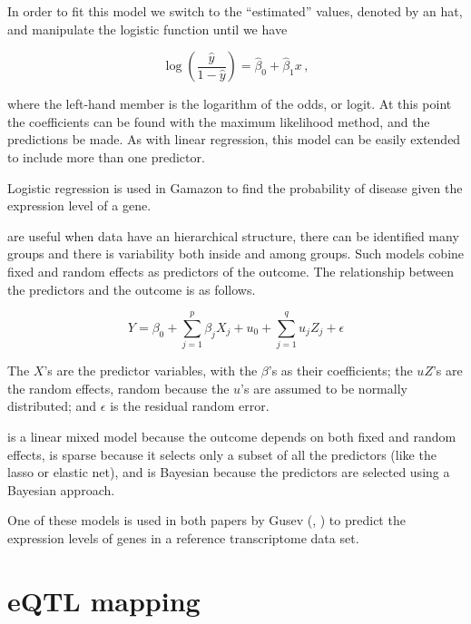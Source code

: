 \documentclass[../main.tex]{subfiles}
\begin{document}
In order to fit this model we switch to the \enquote{estimated} values, 
denoted by an hat, and manipulate the logistic function until we have

\begin{equation}
	\log\left(\frac{\hat{y}}{1-\hat{y}}\right) =
		\hat{\beta}_0 + \hat{\beta}_1 x\,,
\end{equation}

where the left-hand member is the logarithm of the odds, or logit. At 
this point the coefficients can be found with the maximum likelihood 
method, and the predictions be made. As with linear regression, this 
model can be easily extended to include more than one predictor.

Logistic regression is used in Gamazon \etal to find the probability of 
disease given the expression level of a gene.

 are useful when data have an 
hierarchical structure, \ie there can be identified many groups and 
there is variability both inside and among groups. Such models cobine 
fixed and random effects as predictors of the outcome. The relationship 
between the predictors and the outcome is as follows.

\begin{equation}
	Y = \beta_0 + \sum_{j=1}^{p} \beta_j X_j +
		u_0 + \sum_{j=1}^{q} u_j Z_j + \epsilon
\end{equation}

The $X$'s are the predictor variables, with the $\beta$'s as their 
coefficients; the $uZ$'s are the random effects, random because the 
$u$'s are assumed to be normally distributed; and $\epsilon$ is the 
residual random error.

 is a 
linear mixed model because the outcome depends on both fixed and random 
effects, is sparse because it selects only a subset of all the 
predictors (like the lasso or elastic net), and is Bayesian because the 
predictors are selected using a Bayesian approach.

One of these models is used in both papers by Gusev \etal 
(, ) to predict the expression levels 
of genes in a reference transcriptome data set.

\section{eQTL mapping}
\end{document}
